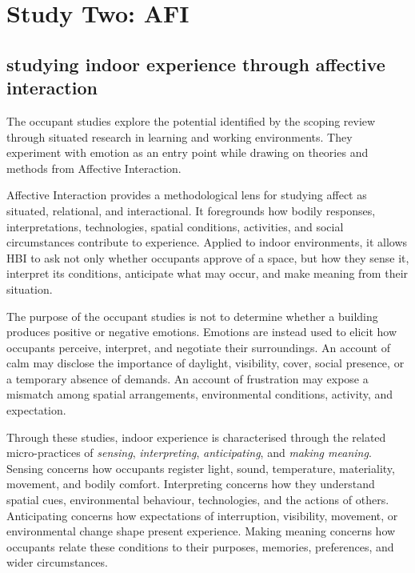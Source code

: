 \chapter{Study Two: AFI}\label{ch:study-two}

\begin{synopsis}
\section{studying indoor experience through affective interaction}

The occupant studies explore the potential identified by the scoping review through situated research in learning and working environments. They experiment with emotion as an entry point while drawing on theories and methods from Affective Interaction.

Affective Interaction provides a methodological lens for studying affect as situated, relational, and interactional. It foregrounds how bodily responses, interpretations, technologies, spatial conditions, activities, and social circumstances contribute to experience. Applied to indoor environments, it allows HBI to ask not only whether occupants approve of a space, but how they sense it, interpret its conditions, anticipate what may occur, and make meaning from their situation.

The purpose of the occupant studies is not to determine whether a building produces positive or negative emotions. Emotions are instead used to elicit how occupants perceive, interpret, and negotiate their surroundings. An account of calm may disclose the importance of daylight, visibility, cover, social presence, or a temporary absence of demands. An account of frustration may expose a mismatch among spatial arrangements, environmental conditions, activity, and expectation.

Through these studies, indoor experience is characterised through the related micro-practices of \emph{sensing}, \emph{interpreting}, \emph{anticipating}, and \emph{making meaning}. Sensing concerns how occupants register light, sound, temperature, materiality, movement, and bodily comfort. Interpreting concerns how they understand spatial cues, environmental behaviour, technologies, and the actions of others. Anticipating concerns how expectations of interruption, visibility, movement, or environmental change shape present experience. Making meaning concerns how occupants relate these conditions to their purposes, memories, preferences, and wider circumstances.


\end{synopsis}

